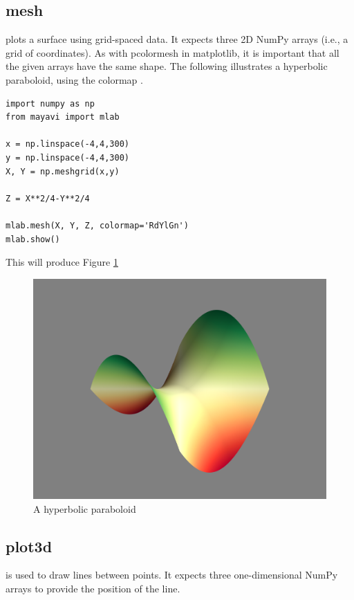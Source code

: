 \subsection*{mesh}
 plots a surface using grid-spaced data.
It expects three 2D NumPy arrays (i.e., a grid of  coordinates).
As with pcolormesh in matplotlib, it is important that all the given arrays have the same shape.
The following illustrates a hyperbolic paraboloid, using the colormap .
\begin{lstlisting}
import numpy as np
from mayavi import mlab

x = np.linspace(-4,4,300)
y = np.linspace(-4,4,300)
X, Y = np.meshgrid(x,y)

Z = X**2/4-Y**2/4

mlab.mesh(X, Y, Z, colormap='RdYlGn')
mlab.show()
\end{lstlisting}

This will produce Figure \ref{fig:mesh_example}
\begin{figure}
\includegraphics[width=\textwidth]{mesh_example.png}
\caption{A hyperbolic paraboloid}
\label{fig:mesh_example}
\end{figure}

\subsection*{plot3d}
 is used to draw lines between points.
It expects three one-dimensional NumPy arrays to provide the position of the line.


